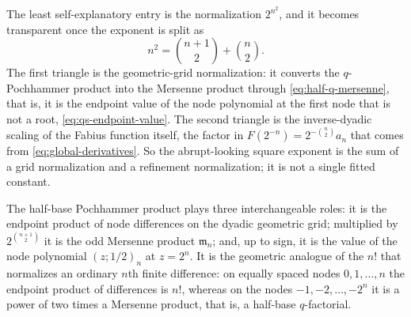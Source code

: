 \documentclass[11pt,oneside]{article}
\theoremstyle{definition}
\theoremstyle{remark}
\begin{document}
The least self-explanatory entry is the normalization $2^{n^2}$, and it becomes transparent
once the exponent is split as
\begin{equation}
 n^2=\binom{n+1}2+\binom n2.                               \label{eq:qs-square-split}
\end{equation}
The first triangle is the geometric-grid normalization: it converts the $q$-Pochhammer
product into the Mersenne product through \eqref{eq:half-q-mersenne}, that is, it is the
endpoint value of the node polynomial at the first node that is not a root,
\eqref{eq:qs-endpoint-value}.  The second triangle is the inverse-dyadic scaling of the
Fabius function itself, the factor in $F(2^{-n})=2^{-\binom n2}a_n$ that comes from
\eqref{eq:global-derivatives}.  So the abrupt-looking square exponent is the sum of a
grid normalization and a refinement normalization; it is not a single fitted constant.

The half-base Pochhammer product plays three interchangeable roles: it is the endpoint
product of node differences on the dyadic geometric grid; multiplied by $2^{\binom{n+1}2}$ it
is the odd Mersenne product $\mathfrak m_n$; and, up to sign, it is the value of the node
polynomial $(z;1/2)_n$ at $z=2^n$.  It is the geometric analogue of the $n!$ that normalizes
an ordinary $n$th finite difference: on equally spaced nodes $0,1,\ldots,n$ the endpoint
product of differences is $n!$, whereas on the nodes $-1,-2,\ldots,-2^n$ it is a power of two
times a Mersenne product, that is, a half-base $q$-factorial.
\end{document}
